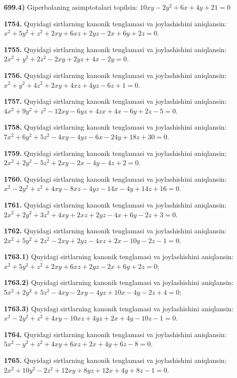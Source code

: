 \textbf{699.4)} Giperbolaning asimptotalari topilsin: \(10xy - 2y^{2} + 6x + 4y + 21 = 0\)

\textbf{1754.} Quyidagi sirtlarning kanonik tenglamasi va joylashishini aniqlansin: \(x^{2} + 5y^{2} + z^{2} + 2xy + 6xz + 2yz - 2x + 6y + 2z = 0\).

\textbf{1755.} Quyidagi sirtlarning kanonik tenglamasi va joylashishini aniqlansin: \(2x^{2} + y^{2} + 2z^{2} - 2xy + 2yz + 4x - 2y = 0\).

\textbf{1756.} Quyidagi sirtlarning kanonik tenglamasi va joylashishini aniqlansin: \(x^{2} + y^{2} + 4z^{2} + 2xy + 4xz + 4yz - 6z + 1 = 0\).

\textbf{1757.} Quyidagi sirtlarning kanonik tenglamasi va joylashishini aniqlansin: \(4x^{2} + 9y^{2} + z^{2} - 12xy - 6yz + 4zx + 4x - 6y + 2z - 5 = 0\).

\textbf{1758.} Quyidagi sirtlarning kanonik tenglamasi va joylashishini aniqlansin: \(7x^{2} + 6y^{2} + 5z^{2} - 4xy - 4yz - 6x - 24y + 18z + 30 = 0\).

\textbf{1759.} Quyidagi sirtlarning kanonik tenglamasi va joylashishini aniqlansin: \(2x^{2} + 2y^{2} - 5z^{2} + 2xy - 2x - 4y - 4z + 2 = 0\).

\textbf{1760.} Quyidagi sirtlarning kanonik tenglamasi va joylashishini aniqlansin: \(x^{2} - 2y^{2} + z^{2} + 4xy - 8xz - 4yz - 14x - 4y + 14z + 16 = 0\).

\textbf{1761.} Quyidagi sirtlarning kanonik tenglamasi va joylashishini aniqlansin: \(2x^{2} + 2y^{2} + 3z^{2} + 4xy + 2xz + 2yz - 4x + 6y - 2z + 3 = 0\).

\textbf{1762.} Quyidagi sirtlarning kanonik tenglamasi va joylashishini aniqlansin: \(2x^{2} + 5y^{2} + 2z^{2} - 2xy + 2yz - 4xz + 2x - 10y - 2z - 1 = 0\).

\textbf{1763.1)} Quyidagi sirtlarning kanonik tenglamasi va joylashishini aniqlansin: \(x^{2} + 5y^{2} + z^{2} + 2xy + 6xz + 2yz - 2x + 6y + 2z = 0\);

\textbf{1763.2)} Quyidagi sirtlarning kanonik tenglamasi va joylashishini aniqlansin: \(5x^{2} + 2y^{2} + 5z^{2} - 4xy - 2xy - 4yz + 10x - 4y - 2z + 4 = 0\);

\textbf{1763.3)} Quyidagi sirtlarning kanonik tenglamasi va joylashishini aniqlansin: \(x^{2} - 2y^{2} + z^{2} + 4xy - 10xz + 4yz + 2x + 4y - 10z - 1 = 0\).

\textbf{1764.} Quyidagi sirtlarning kanonik tenglamasi va joylashishini aniqlansin: \(5x^{2} - y^{2} + z^{2} + 4xy + 6xz + 2x + 4y + 6z - 8 = 0\).

\textbf{1765.} Quyidagi sirtlarning kanonik tenglamasi va joylashishini aniqlansin: \(2x^{2} + 10y^{2} - 2z^{2} + 12xy + 8yz + 12x + 4y + 8z - 1 = 0\).
